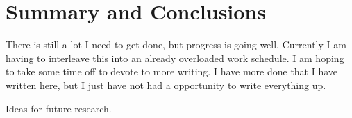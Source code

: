 \chapter{Summary and Conclusions}
\label{ch:conclusions}
There is still a lot I need to get done, but progress is going well.  Currently I am having to interleave this into an already overloaded work schedule.  I am hoping to take some time off to devote to more writing.  I have more done that I have written here, but I just have not had a opportunity to write everything up.

Ideas for future research.
